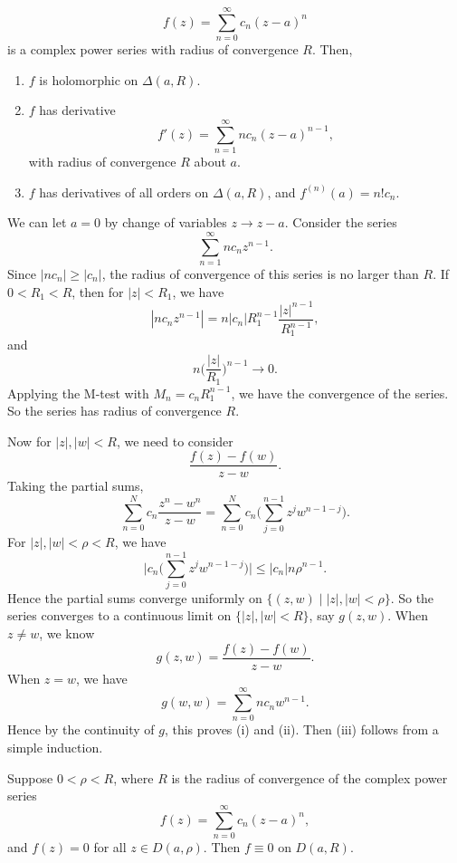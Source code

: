 \documentclass[12pt]{article}
\begin{document}
\begin{theorem} 
	\[
	f(z) = \sum_{n = 0}^{\infty} c_n(z - a)^{n}
	\]
	is a complex power series with radius of convergence $R$. Then,
	\begin{enumerate}[\normalfont(i)]
		\item $f$ is holomorphic on $\Delta(a, R)$.
		\item $f$ has derivative
			\[
			f'(z) = \sum_{n = 1}^{\infty} n c_n (z - a)^{n-1}
			,\]
			with radius of convergence $R$ about $a$.
		\item $f$ has derivatives of all orders on $\Delta(a, R)$, and $f^{(n)}(a) = n! c_n$.
	\end{enumerate}
\end{theorem}

\begin{proofbox}
	We can let $a = 0$ by change of variables $z \to z - a$. Consider the series
	\[
	\sum_{n = 1}^{\infty}n c_n z^{n-1}
	.\]
	Since $|n c_n| \geq |c_n|$, the radius of convergence of this series is no larger than $R$. If $0 < R_1 < R$, then for $|z| < R_1$, we have
	\[
	|n c_n z^{n-1}| = n |c_n| R_1^{n-1} \frac{|z|^{n-1}}{R_1^{n-1}}
	,\]
	and
	\[
	n \biggl( \frac{|z|}{R_1} \biggr)^{n-1} \to 0
	.\]
	Applying the M-test with $M_n = c_n R_1^{n-1}$, we have the convergence of the series. So the series has radius of convergence $R$.

	Now for $|z|, |w| < R$, we need to consider
	\[
	\frac{f(z) - f(w)}{z - w}
	.\]
	Taking the partial sums,
	\[
		\sum_{n = 0}^{N} c_n \frac{z^{n} - w^{n}}{z - w} = \sum_{n = 0}^{N} c_n \Biggl( \sum_{j = 0}^{n-1} z^{j}w^{n-1-j}\Biggr)
	.\]
	For $|z|, |w| < \rho < R$, we have
	\[
	\biggl| c_n \Biggl( \sum_{j = 0}^{n-1} z^{j} w^{n-1-j} \Biggr) \biggr| \leq |c_n| n \rho^{n-1}
	.\]
	Hence the partial sums converge uniformly on $\{(z, w) \mid |z|, |w| < \rho\}$. So the series converges to a continuous limit on $\{|z|, |w| < R\}$, say $g(z, w)$. When $z \neq w$, we know
	\[
	g(z, w) = \frac{f(z) - f(w)}{z - w}
	.\]
	When $z = w$, we have
	\[
	g(w, w) = \sum_{n = 0}^{\infty} n c_n w^{n-1}
	.\]
	Hence by the continuity of $g$, this proves (i) and (ii). Then (iii) follows from a simple induction.
\end{proofbox}

\begin{corollary}
	Suppose $0 < \rho < R$, where $R$ is the radius of convergence of the complex power series
	\[
	f(z) = \sum_{n = 0}^{\infty}c_n (z - a)^{n}
	,\]
	and $f(z) = 0$ for all $z \in D(a, \rho)$. Then $f \equiv 0$ on $D(a, R)$.
\end{corollary}
\end{document}
